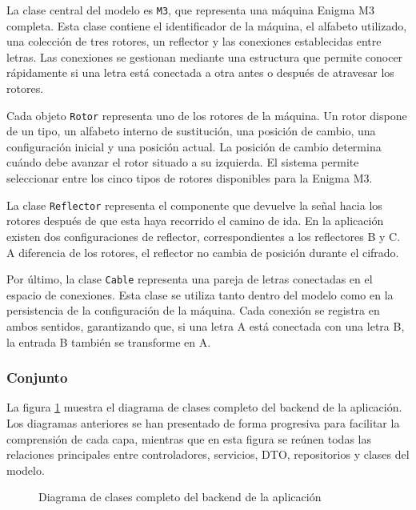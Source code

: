La clase central del modelo es \texttt{M3}, que representa una máquina Enigma M3 completa. Esta clase contiene el identificador de la máquina, el alfabeto utilizado, una colección de tres rotores, un reflector y las conexiones establecidas entre letras. Las conexiones se gestionan mediante una estructura que permite conocer rápidamente si una letra está conectada a otra antes o después de atravesar los rotores.

Cada objeto \texttt{Rotor} representa uno de los rotores de la máquina. Un rotor dispone de un tipo, un alfabeto interno de sustitución, una posición de cambio, una configuración inicial y una posición actual. La posición de cambio determina cuándo debe avanzar el rotor situado a su izquierda. El sistema permite seleccionar entre los cinco tipos de rotores disponibles para la Enigma M3.

La clase \texttt{Reflector} representa el componente que devuelve la señal hacia los rotores después de que esta haya recorrido el camino de ida. En la aplicación existen dos configuraciones de reflector, correspondientes a los reflectores B y C. A diferencia de los rotores, el reflector no cambia de posición durante el cifrado.

Por último, la clase \texttt{Cable} representa una pareja de letras conectadas en el espacio de conexiones. Esta clase se utiliza tanto dentro del modelo como en la persistencia de la configuración de la máquina. Cada conexión se registra en ambos sentidos, garantizando que, si una letra A está conectada con una letra B, la entrada B también se transforme en A.

\subsubsection{Conjunto}

La figura \ref{clases_completo} muestra el diagrama de clases completo del backend de la aplicación. Los diagramas anteriores se han presentado de forma progresiva para facilitar la comprensión de cada capa, mientras que en esta figura se reúnen todas las relaciones principales entre controladores, servicios, DTO, repositorios y clases del modelo.

\begin{figure}[htbp]
	\centerline{}
	\caption{Diagrama de clases completo del backend de la aplicación}
	\label{clases_completo}
\end{figure}


